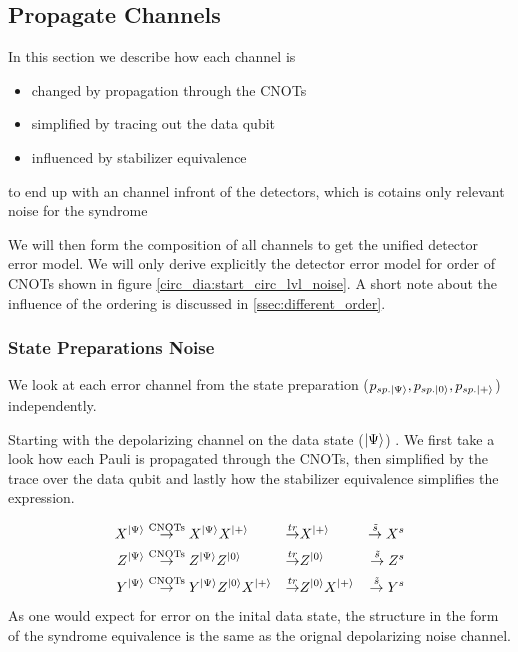\subsection{Propagate Channels}\label{ssec:moving_each_channel_to_the_end}

In this section we describe how each channel is
\begin{itemize}
    \item changed by propagation through the CNOTs
    \item simplified by tracing out the data qubit
    \item influenced by stabilizer equivalence 
\end{itemize} 
to end up with an channel infront of the detectors, which is cotains only relevant noise for the syndrome

We will then form the composition of all channels to get the unified detector error model.
We will only derive explicitly the detector error model for order of CNOTs shown in figure \ref{circ_dia:start_circ_lvl_noise}.
A short note about the influence of the ordering is discussed in \ref{ssec:different_order}.


\subsubsection{State Preparations Noise}

We look at each error channel from the state preparation ($p_{sp.\ket{\Psi}},p_{sp.\ket{0}},p_{sp.\ket{+}}$) independently. 

Starting with the depolarizing channel on the data state ($\ket{\Psi}$) .
We first take a look how each Pauli is propagated through the CNOTs,
then simplified by the trace over the data qubit and lastly how the stabilizer equivalence simplifies the expression. 

\begin{align*}
    X^{\ket{\Psi}}  
    &\overset{\text{CNOTs}}{\rightarrow} X^{\ket{\Psi}} X^{\ket{+}} 
    &\overset{tr}{\rightarrow} &X^{\ket{+}}   
    &\overset{\tilde{s}}{\rightarrow} X^s  \\
    Z^{\ket{\Psi}}  
    &\overset{\text{CNOTs}}{\rightarrow} Z^{\ket{\Psi}} Z^{\ket{0}} 
    &\overset{tr}{\rightarrow} & Z^{\ket{0}}  
    &\overset{\tilde{s}}{\rightarrow} Z^s  \\
    Y^{\ket{\Psi}}  
    &\overset{\text{CNOTs}}{\rightarrow} Y^{\ket{\Psi}} Z^{\ket{0}} X^{\ket{+}}
    &\overset{tr}{\rightarrow} & Z^{\ket{0}} X^{\ket{+}} 
    &\overset{\tilde{s}}{\rightarrow} Y^s  \\
\end{align*} 
As one would expect for error on the inital data state, the structure in the form of the syndrome equivalence is the same as the orignal depolarizing noise channel.

